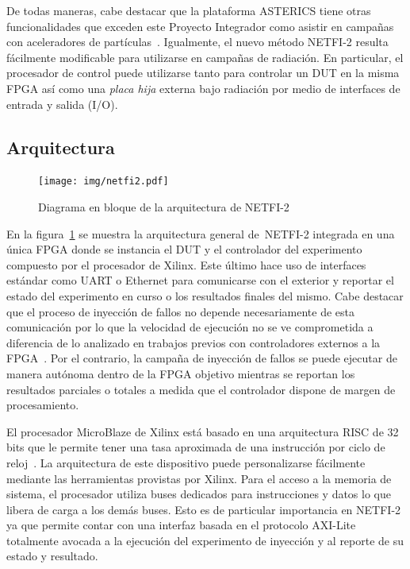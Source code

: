 \documentclass[a4paper,openright,12pt]{report}
\begin{document}
De todas maneras, cabe destacar que la plataforma ASTERICS tiene otras funcionalidades que exceden este Proyecto Integrador como asistir en campañas con aceleradores de partículas~\cite{Velazco2001}. Igualmente, el nuevo método NETFI-2 resulta fácilmente modificable para utilizarse en campañas de radiación. En particular, el procesador de control puede utilizarse tanto para controlar un DUT en la misma FPGA así como una \emph{placa hija} externa bajo radiación por medio de interfaces de entrada y salida (I/O). 

\subsection{Arquitectura}

\begin{figure}[H]
	\centering
	\texttt{[image: img/netfi2.pdf]}
	\caption{Diagrama en bloque de la arquitectura de NETFI-2}
	\label{netfi2}
\end{figure}

En la figura~\ref{netfi2} se muestra la arquitectura general de~\mbox{NETFI-2} integrada en una única FPGA donde se instancia el DUT y el controlador del experimento compuesto por el procesador de Xilinx. Este último hace uso de interfaces estándar como UART o Ethernet para comunicarse con el exterior y reportar el estado del experimento en curso o los resultados finales del mismo. Cabe destacar que el proceso de inyección de fallos no depende necesariamente de esta comunicación por lo que la velocidad de ejecución no se ve comprometida a diferencia de lo analizado en trabajos previos con controladores externos a la FPGA~\cite{Serrano2015}. Por el contrario, la campaña de inyección de fallos se puede ejecutar de manera autónoma dentro de la FPGA objetivo mientras se reportan los resultados parciales o totales a medida que el controlador dispone de margen de procesamiento.

El procesador MicroBlaze de Xilinx está basado en una arquitectura RISC de 32 bits que le permite tener una tasa aproximada de una instrucción por ciclo de reloj~\cite{uBlaze}. La arquitectura de este dispositivo puede personalizarse fácilmente  mediante las herramientas provistas por Xilinx. Para el acceso a la memoria de sistema, el procesador utiliza buses dedicados para instrucciones y datos lo que libera de carga a los demás buses. Esto es de particular importancia en NETFI-2 ya que permite contar con una interfaz basada en el protocolo AXI-Lite ~\cite{AXI} totalmente avocada a la ejecución del experimento de inyección y al reporte de su estado y resultado. 
\end{document}
